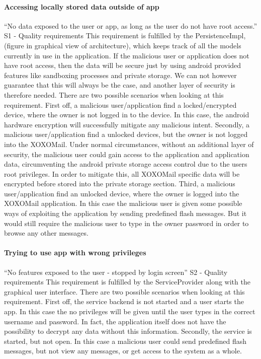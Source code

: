 \paragraph{Accessing locally stored data outside of app}
“No data exposed to the user or app, as long as the user do not have root access.” S1 - Quality requirements
\newline
\newline
This requirement is fulfilled by the PersistenceImpl, (figure in graphical view of architecture), which keeps track of all the models currently in use in the application. If the malicious user or application does not have root access, then the data will be secure just by using android provided features like sandboxing processes and private storage. We can not however guarantee that this will always be the case, and another layer of security is therefore needed. 
\newline
\newline
There are two possible scenarios when looking at this requirement. First off, a malicious user/application find a locked/encrypted device, where the owner is not logged in to the device. In this case, the android hardware encryption will successfully mitigate any malicious intent.
Secondly, a malicious user/application find a unlocked devices, but the owner is not logged into the XOXOMail. Under normal circumstances, without an additional layer of security, the malicious user could gain access to the application and application data, circumventing the android private storage access control due to the users root privileges. In order to mitigate this, all XOXOMail specific data will be encrypted before stored into the private storage section. 
Third, a malicious user/application find an unlocked device, where the owner is logged into the XOXOMail application. In this case the malicious user is given some possible ways of exploiting the application by sending predefined flash messages. But it would still require the malicious user to type in the owner password in order to browse any other messages. 

\paragraph{Trying to use app with wrong privileges}
“No features exposed to the user - stopped by login screen” S2 - Quality requirements
\newline
\newline
This requirement is fulfilled by the ServiceProvider along with the graphical user interface. There are two possible scenarios when looking at this requirement. First off, the service backend is not started and a user starts the app. In this case the no privileges will be given until the user types in the correct username and password. In fact, the application itself does not have the possibility to decrypt any data without this information.
	Secondly, the service is started, but not open. In this case a malicious user could send predefined flash messages, but not view any messages, or get access to the system as a whole. 


